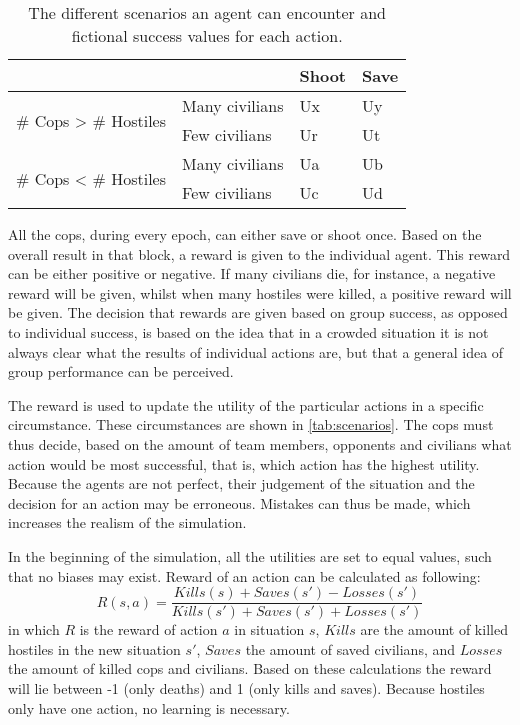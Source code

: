 \begin{table}[!ht]
  \begin{center}
    \begin{tabular}{l l | l l}
      \hline
      & & Shoot & Save \\
      \hline
      \multirow{2}{*}{\# Cops > \# Hostiles} & Many civilians & Ux & Uy \\
      & Few civilians & Ur & Ut \\
      \hline
      \multirow{2}{*}{\# Cops < \# Hostiles} & Many civilians & Ua & Ub\\
      & Few civilians & Uc & Ud\\
      \hline
    \end{tabular}
    \caption{The different scenarios an agent can encounter and fictional success values for each action.
    }
    \label{tab:scenarios}
  \end{center}
\end{table}
All the cops, during every epoch, can either save or shoot once.
Based on the overall result in that block, a reward is given to the individual agent.
This reward can be either positive or negative.
If many civilians die, for instance, a negative reward will be given, whilst when many hostiles were killed, a positive reward will be given.
The decision that rewards are given based on group success, as opposed to individual success, is based on the idea that in a crowded situation it is not always clear what the results of individual actions are, but that a general idea of group performance can be perceived.


The reward is used to update the utility of the particular actions in a specific circumstance.
These circumstances are shown in \autoref{tab:scenarios}.
The cops must thus decide, based on the amount of team members, opponents and civilians what action would be most successful, that is, which action has the highest utility.
Because the agents are not perfect, their judgement of the situation and the decision for an action may be erroneous.
Mistakes can thus be made, which increases the realism of the simulation.


In the beginning of the simulation, all the utilities are set to equal values, such that no biases may exist.
Reward of an action can be calculated as following: 
$$ R(s,a) = \frac{Kills(s) + Saves(s') - Losses(s')}{Kills(s') + Saves(s') + Losses(s')}$$
in which $R$ is the reward of action $a$ in situation $s$, $Kills$ are the amount of killed hostiles in the new situation $s'$, $Saves$ the amount of saved civilians, and $Losses$ the amount of killed cops and civilians.
Based on these calculations the reward will lie between -1 (only deaths) and 1 (only kills and saves).
Because hostiles only have one action, no learning is necessary.


